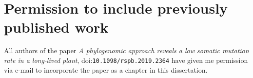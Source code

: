 \chapter{Permission to include previously published work}
\label{ch:permission}

All authors of the paper \textit{A phylogenomic approach reveals a low somatic mutation rate in a long-lived plant}, doi:\texttt{10.1098/rspb.2019.2364} have given me permission via e-mail to incorporate the paper as a chapter in this dissertation.
